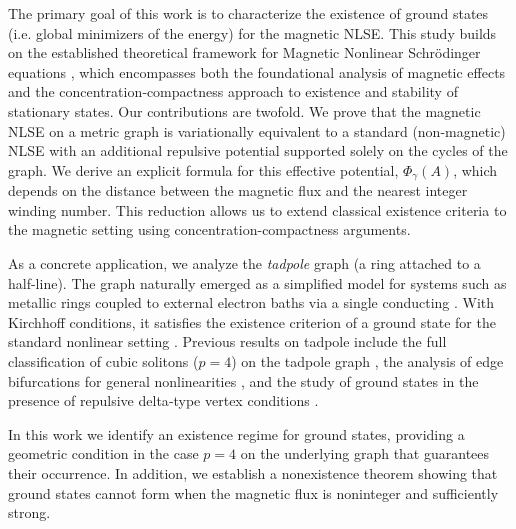 \documentclass[12pt,a4paper]{amsart}
\theoremstyle{definition}
\theoremstyle{plain}
\numberwithin{equation}{section}
\begin{document}
The primary goal of this work is to characterize the existence of ground states (i.e. global minimizers of the energy) for the magnetic NLSE.  This study builds on the established theoretical framework for Magnetic Nonlinear Schrödinger equations \cite{CazenaveEsteban1988,EstebanLions1989,StubbeVazquez1989a,StubbeVazquez1989b}, which encompasses both the foundational analysis of magnetic effects and the concentration‑compactness approach to existence and stability of stationary states. 
Our contributions are twofold.
We prove that the magnetic NLSE on a metric graph is variationally equivalent to a standard (non-magnetic) NLSE with an additional repulsive potential supported solely on the cycles of the graph. We derive an explicit formula for this effective potential, $\Phi_\gamma(A)$, which depends on the distance between the magnetic flux and the nearest integer winding number. This reduction allows us to extend classical existence criteria \cite{Adami2015} to the magnetic setting using concentration-compactness arguments.

As a concrete application, we analyze the \textit{tadpole} graph (a ring attached to a half-line). The graph naturally emerged as a simplified model for systems such as metallic rings coupled to external electron baths via a single conducting \cite{Exner97}. With Kirchhoff conditions, it satisfies the existence criterion of a ground state for the standard nonlinear setting \cite{Adami2016}. Previous results on tadpole include the full classification of cubic solitons ($p=4$) on the tadpole graph \cite{NCF15}, the analysis of edge bifurcations for general nonlinearities \cite{NPS2015}, and the study of ground states in the presence of repulsive delta‑type vertex conditions \cite{DDL2025}.


In this work we identify an existence regime for ground states, providing a geometric condition in the case $p=4$ on the underlying graph that guarantees their occurrence. In addition, we establish a nonexistence theorem showing that ground states cannot form when the magnetic flux is noninteger and sufficiently strong.
\end{document}
